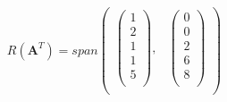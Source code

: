 \documentclass[times, 12pt]{article}
\begin{document}
\begin{description}
$$R(\textbf{A}^T) = span\left(
                        \begin{array}{cc}
                          \left(
                            \begin{array}{c}
                              1 \\
                              2 \\
                              1 \\
                              1 \\
                              5 \\
                            \end{array}
                          \right)
                           , & \left(
                               \begin{array}{c}
                                 0 \\
                                 0 \\
                                 2 \\
                                 6 \\
                                 8 \\
                               \end{array}
                             \right)
                            \\
                        \end{array}
                      \right) $$


\end{description}
\end{document}
